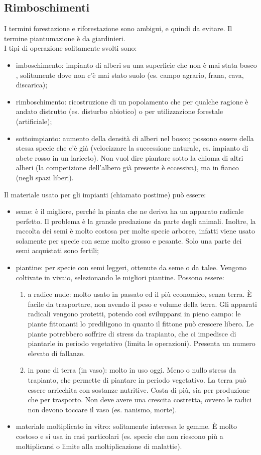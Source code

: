 \subsection{Rimboschimenti}
I termini forestazione e riforestazione sono ambigui, e quindi da evitare. Il termine piantumazione è da giardinieri.\\
I tipi di operazione solitamente svolti sono:
\begin{itemize}[nosep]
    \item imboschimento: impianto di alberi su una superficie che non è mai stata bosco , solitamente dove non c'è mai stato suolo (es. campo agrario, frana, cava, discarica);
    \item rimboschimento: ricostruzione di un popolamento che per qualche ragione è andato distrutto (es. disturbo abiotico) o per utilizzazione forestale (artificiale);
    \item sottoimpianto: aumento della densità di alberi nel bosco; possono essere della stessa specie che c'è già (velocizzare la successione naturale, es. impianto di abete rosso in un lariceto). Non vuol dire piantare sotto la chioma di altri alberi (la competizione dell'albero già presente è eccessiva), ma in fianco (negli spazi liberi).
\end{itemize}
Il materiale usato per gli impianti (chiamato postime) può essere:
\begin{itemize}[nosep]
    \item seme: è il migliore, perché la pianta che ne deriva ha un apparato radicale perfetto. Il problema è la grande predazione da parte degli animali. Inoltre, la raccolta dei semi è molto costosa per molte specie arboree, infatti viene usato solamente per specie con seme molto grosso e pesante. Solo una parte dei semi acquistati sono fertili;
    \item piantine: per specie con semi leggeri, ottenute da seme o da talee. Vengono coltivate in vivaio, selezionando le migliori piantine. Possono essere:
    \begin{enumerate}[nosep]
        \item a radice nude: molto usato in passato ed il più economico, senza terra. È facile da trasportare, non avendo il peso e volume della terra. Gli apparati radicali vengono protetti, potendo così svilupparsi in pieno campo: le piante fittonanti lo prediligono in quanto il fittone può crescere libero. Le piante potrebbero soffrire di stress da trapianto, che ci impedisce di piantarle in periodo vegetativo (limita le operazioni). Presenta un numero elevato di fallanze.
        \item in pane di terra (in vaso): molto in uso oggi. Meno o nullo stress da trapianto, che permette di piantare in periodo vegetativo. La terra può essere arricchita con sostanze nutritive. Costa di più, sia per produzione che per trasporto. Non deve avere una crescita costretta, ovvero le radici non devono toccare il vaso (es. nanismo, morte). 
    \end{enumerate}
 \item materiale moltiplicato in vitro: solitamente interessa le gemme. È molto costoso e si usa in casi particolari (es. specie che non riescono più a moltiplicarsi o limite alla moltiplicazione di malattie).
\end{itemize}
